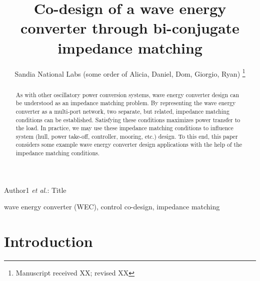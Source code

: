 \documentclass[lettersize,journal]{IEEEtran}
\begin{document}
\title{Co-design of a wave energy converter through bi-conjugate impedance matching }
{}
\author{Sandia National Labs (some order of Alicia, Daniel, Dom, Giorgio, Ryan)
\thanks{Manuscript received XX; revised XX}}

%
{Author1 \MakeLowercase{\textit{et al.}}: Title}


\maketitle

\begin{abstract}
As with other oscillatory power conversion systems, wave energy converter design can be understood as an impedance matching problem.
By representing the wave energy converter as a multi-port network, two separate, but related, impedance matching conditions can be established.
Satisfying these conditions maximizes power transfer to the load.
In practice, we may use these impedance matching conditions to influence system (hull, power take-off, controller, mooring, etc.) design.
To this end, this paper considers some example wave energy converter design applications with the help of the impedance matching conditions.
\end{abstract}

\begin{IEEEkeywords}
wave energy converter (WEC), control co-design, impedance matching
\end{IEEEkeywords}

\section{Introduction}
\end{document}
